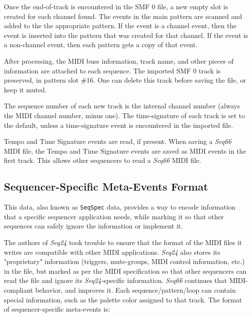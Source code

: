    Once the end-of-track is encountered in the SMF 0 file, a new empty
   slot is created for each channel found.
   The events in the main pattern are scanned and added to the
   the appropriate pattern.  If the event is a channel event,
   then the event is inserted into the pattern that was created for that
   channel.  If the event is a non-channel event, then each pattern gets a
   copy of that event.

   After processing, the MIDI buss information, track name, and other pieces of
   information are attached to each sequence.
   The imported SMF 0 track is preserved, in
   pattern slot \#16.
   One can delete this track before saving the file, or keep it muted.

   The sequence number of each new track is the internal channel number
   (always the MIDI channel number, minus one).
   The time-signature of each track is set to the default, unless a
   time-signature event is encountered in the imported file.

   Tempo and Time Signature events are read, if present.
   When saving a \textsl{Seq66} MIDI file,
   the Tempo and Time Signature events are saved as MIDI events in
   the first track.
   This allows other sequencers to read a \textsl{Seq66} MIDI file.

\subsection{Sequencer-Specific Meta-Events Format}
\label{subsec:midi_format_meta_format}

   This data, also known as
   \texttt{SeqSpec} data, provides a way to encode information
   that a specific sequencer application needs, while marking it so that other
   sequences can safely ignore the information or implement it.

   The authors of \textsl{Seq24} took trouble to ensure that the format
   of the MIDI files it writes are compatible with other MIDI applications.
   \textsl{Seq24} also stores its "proprietary"
   information (triggers, mute-groups, MIDI control
   information, etc.) in the file, but marked as per the MIDI specification
   so that other sequencers can read
   the file and ignore its \textsl{Seq24}-specific information.
   \textsl{Seq66} continues that MIDI-compliant behavior, and improves it.
   Each sequence/pattern/loop can contain special information, such as the
   palette color assigned to that track.
   The format of sequencer-specific meta-events is:

